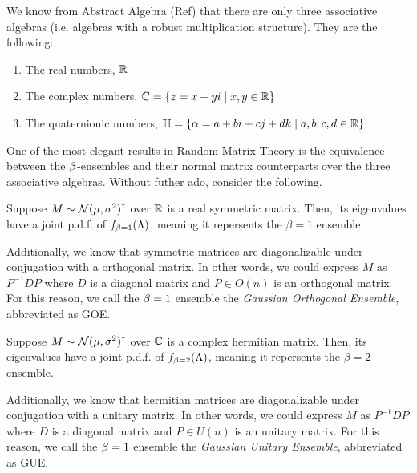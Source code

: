 We know from Abstract Algebra (Ref) that there are only three associative algebras (i.e. algebras with a robust multiplication structure).
They are the following:
\begin{enumerate}
  \item The real numbers, $\mathbb{R}$
  \item The complex numbers, $\mathbb{C} = \{ z = x + yi \mid x,y \in \mathbb{R} \}$
  \item The quaternionic numbers, $\mathbb{H} = \{ \alpha = a + bi + cj + dk \mid a,b,c,d \in \mathbb{R} \}$
\end{enumerate}


One of the most elegant results in Random Matrix Theory is the equivalence between the $\beta$-ensembles
and their normal matrix counterparts over the three associative algebras. Without futher ado, consider the following.

\medskip

 Suppose $M \sim \mathcal{N}(\mu,\sigma^2)^\dagger$ over $\mathbb{R}$ is a real symmetric matrix.
Then, its eigenvalues have a joint p.d.f. of $f_{\beta = 1}(\Lambda)$, meaning it repersents the $\beta = 1$ ensemble.

Additionally, we know that symmetric matrices are diagonalizable under conjugation with a orthogonal matrix.
In other words, we could express $M$ as $P^{-1} D P$ where $D$ is a diagonal matrix and $P \in O(n)$ is an orthogonal matrix.
For this reason, we call the $\beta = 1$ ensemble the \textit{Gaussian Orthogonal Ensemble}, abbreviated as GOE.

\bigskip

 Suppose $M \sim \mathcal{N}(\mu,\sigma^2)^\dagger$ over $\mathbb{C}$ is a complex hermitian matrix.
Then, its eigenvalues have a joint p.d.f. of $f_{\beta = 2}(\Lambda)$, meaning it repersents the $\beta = 2$ ensemble.

Additionally, we know that hermitian matrices are diagonalizable under conjugation with a unitary matrix.
In other words, we could express $M$ as $P^{-1} D P$ where $D$ is a diagonal matrix and $P \in U(n)$ is an unitary matrix.
For this reason, we call the $\beta = 1$ ensemble the \textit{Gaussian Unitary Ensemble}, abbreviated as GUE.

